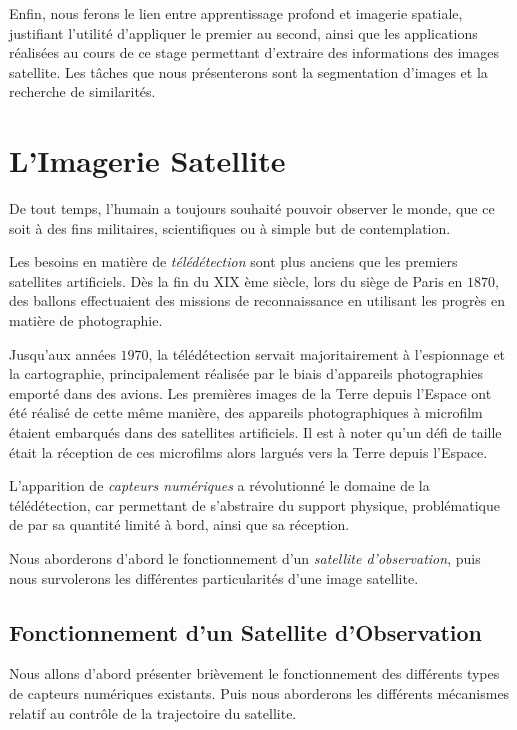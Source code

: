 \documentclass[a4paper, 11pt]{report}
\begin{document}
Enfin, nous ferons le lien entre apprentissage profond et imagerie spatiale, justifiant l'utilité d'appliquer le premier au second, ainsi que les applications réalisées au cours de ce stage permettant d'extraire des informations des images satellite. Les tâches que nous présenterons sont la segmentation d'images et la recherche de similarités.

\chapter{L'Imagerie Satellite}
De tout temps, l'humain a toujours souhaité pouvoir observer le monde, que ce soit à des fins militaires, scientifiques ou à simple but de contemplation.

Les besoins en matière de \emph{télédétection} sont plus anciens que les premiers satellites artificiels. Dès la fin du XIX ème siècle, lors du siège de Paris en $1870$, des ballons effectuaient des missions de reconnaissance en utilisant les progrès en matière de photographie.

Jusqu'aux années $1970$, la télédétection servait majoritairement à l'espionnage et la cartographie, principalement réalisée par le biais d'appareils photographies emporté dans des avions.
Les premières images de la Terre depuis l'Espace ont été réalisé de cette même manière, des appareils photographiques à microfilm étaient embarqués dans des satellites artificiels. Il est à noter qu'un défi de taille était la réception de ces microfilms alors largués vers la Terre depuis l'Espace.

L'apparition de \emph{capteurs numériques} a révolutionné le domaine de la télédétection, car permettant de s'abstraire du support physique, problématique de par sa quantité limité à bord, ainsi que sa réception.

Nous aborderons d'abord le fonctionnement d'un \emph{satellite d'observation}, puis nous survolerons les différentes particularités d'une image satellite.
\section{Fonctionnement d'un Satellite d'Observation}
Nous allons d'abord présenter brièvement le fonctionnement des différents types de capteurs numériques existants.
Puis nous aborderons les différents mécanismes relatif au contrôle de la trajectoire du satellite.
\end{document}

